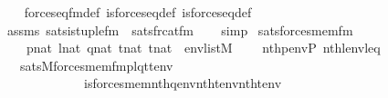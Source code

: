 \begin{isabellebody}
%
\isadelimproof
\ \ %
\endisadelimproof
%
\isatagproof
{}\isamarkupfalse%
\ forces{\isacharunderscore}{\kern0pt}eq{\isacharunderscore}{\kern0pt}fm{\isacharunderscore}{\kern0pt}def\ is{\isacharunderscore}{\kern0pt}forces{\isacharunderscore}{\kern0pt}eq{\isacharunderscore}{\kern0pt}def\ is{\isacharunderscore}{\kern0pt}forces{\isacharunderscore}{\kern0pt}eq{\isacharprime}{\kern0pt}{\isacharunderscore}{\kern0pt}def\isanewline
\ \ \isamarkupfalse%
\ assms\ sats{\isacharunderscore}{\kern0pt}is{\isacharunderscore}{\kern0pt}tuple{\isacharunderscore}{\kern0pt}fm\ \ sats{\isacharunderscore}{\kern0pt}frc{\isacharunderscore}{\kern0pt}at{\isacharunderscore}{\kern0pt}fm\isanewline
\ \ \isamarkupfalse%
\ simp%
\endisatagproof
{\isafoldproof}%
%
\isadelimproof
\isanewline
%
\endisadelimproof
\isanewline
{}\isamarkupfalse%
\ sats{\isacharunderscore}{\kern0pt}forces{\isacharunderscore}{\kern0pt}mem{\isacharunderscore}{\kern0pt}fm{\isacharcolon}{\kern0pt}\isanewline
\ \ \ \ {\isachardoublequoteopen}p{\isasymin}nat{\isachardoublequoteclose}\ {\isachardoublequoteopen}l{\isasymin}nat{\isachardoublequoteclose}\ {\isachardoublequoteopen}q{\isasymin}nat{\isachardoublequoteclose}\ {\isachardoublequoteopen}t{}{\isasymin}nat{\isachardoublequoteclose}\ {\isachardoublequoteopen}t{}{\isasymin}nat{\isachardoublequoteclose}\ \ {\isachardoublequoteopen}env{\isasymin}list{\isacharparenleft}{\kern0pt}M{\isacharparenright}{\kern0pt}{\isachardoublequoteclose}\isanewline
\ \ \ \ {\isachardoublequoteopen}nth{\isacharparenleft}{\kern0pt}p{\isacharcomma}{\kern0pt}env{\isacharparenright}{\kern0pt}{\isacharequal}{\kern0pt}P{\isachardoublequoteclose}\ {\isachardoublequoteopen}nth{\isacharparenleft}{\kern0pt}l{\isacharcomma}{\kern0pt}env{\isacharparenright}{\kern0pt}{\isacharequal}{\kern0pt}leq{\isachardoublequoteclose}\isanewline
\ \ \ {\isachardoublequoteopen}sats{\isacharparenleft}{\kern0pt}M{\isacharcomma}{\kern0pt}forces{\isacharunderscore}{\kern0pt}mem{\isacharunderscore}{\kern0pt}fm{\isacharparenleft}{\kern0pt}p{\isacharcomma}{\kern0pt}l{\isacharcomma}{\kern0pt}q{\isacharcomma}{\kern0pt}t{}{\isacharcomma}{\kern0pt}t{}{\isacharparenright}{\kern0pt}{\isacharcomma}{\kern0pt}env{\isacharparenright}{\kern0pt}\ {\isasymlongleftrightarrow}\isanewline
\ \ \ \ \ \ \ \ \ \ \ \ \ is{\isacharunderscore}{\kern0pt}forces{\isacharunderscore}{\kern0pt}mem{\isacharparenleft}{\kern0pt}nth{\isacharparenleft}{\kern0pt}q{\isacharcomma}{\kern0pt}env{\isacharparenright}{\kern0pt}{\isacharcomma}{\kern0pt}nth{\isacharparenleft}{\kern0pt}t{}{\isacharcomma}{\kern0pt}env{\isacharparenright}{\kern0pt}{\isacharcomma}{\kern0pt}nth{\isacharparenleft}{\kern0pt}t{}{\isacharcomma}{\kern0pt}env{\isacharparenright}{\kern0pt}{\isacharparenright}{\kern0pt}{\isachardoublequoteclose}\isanewline

\end{isabellebody}

